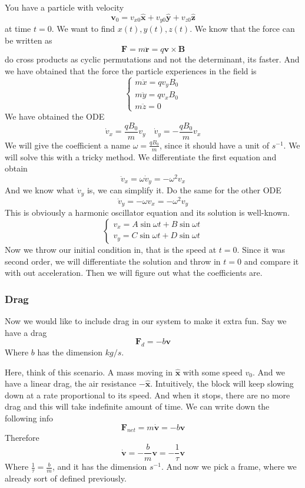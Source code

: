 \documentclass[12pt]{article}
\newcommand{\unx}{\hat{\mathbf{x}}}
\newcommand{\uny}{\hat{\mathbf{y}}}
\newcommand{\unz}{\hat{\mathbf{z}}}
\begin{document}
    You have a particle with velocity 
    \[
    \mathbf{v}_0  = v_{x0}\unx +v_{y0}\uny + v_{z0}\unz 
\] 
at time $t=0$. We want to find $x(t),y(t),z(t)$. We know that the force can be written as
\[
\mathbf{F} = m\ddot{\mathbf{r}} = q\mathbf{v}\times \mathbf{B}
\]
do cross products as cyclic permutations and not the determinant, its faster. And we have obtained that the force the particle experiences in the field is
\[
\begin{cases}
    m\ddot{x} = qv_yB_0\\
    m\ddot{y} = qv_xB_0\\
    m\ddot{z} = 0
\end{cases}
\]
We have obtained the ODE
\[
\dot{v}_x = \frac{qB_0}{m}v_y \quad \dot{v}_y = -\frac{qB_0}{m} v_x
\]
We will give the coefficient a name $\omega = \frac{qB_0}{m}$, since it should have a unit of $s^{-1}$. We will solve this with a tricky method. We differentiate the first equation and obtain
\[
\ddot{v}_x = \omega\dot{v}_y = -\omega^2v_x
\]
And we know what $\dot{v}_y$ is, we can simplify it. Do the same for the other ODE
\[
\ddot{v}_y = -\omega v_x = -\omega^2v_y
\]
This is obviously a harmonic oscillator equation and its solution is well-known. 
\[
\begin{cases}
    v_x = A\sin\omega t + B\sin\omega t\\
    v_y = C\sin\omega t + D\sin\omega t
\end{cases}
\]
Now we throw our initial condition in, that is the speed at $t=0$. Since it was second order, we will differentiate the solution and throw in $t=0$ and compare it with out acceleration. Then we will figure out what the coefficients are. 

\subsubsection{Drag}
Now we would like to include drag in our system to make it extra fun. Say we have a drag
\[
\mathbf{F}_d = -b\mathbf{v}
\]
Where $b$ has the dimension $kg/s$. 

Here, think of this scenario. A mass moving in $\unx$ with some speed $v_0$. And we have a linear drag, the air resistance $-\unx$. Intuitively, the block will keep slowing down at a rate proportional to its speed. And when it stops, there are no more drag and this will take indefinite amount of time. We can write down the following info
\[
\mathbf{F}_{net} = m\dot{\mathbf{v}} = -b\mathbf{v}
\]
Therefore
\[
\dot{\mathbf{v}} = -\frac{b}{m}\mathbf{v} = -\frac{1}{\tau}\mathbf{v}
\]
Where $\frac{1}{\tau} = \frac{b}{m}$, and it has the dimension $s^{-1}$. And now we pick a frame, where we already sort of defined previously. 
\end{document}
